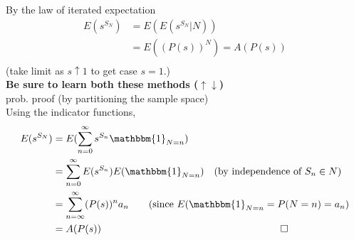\documentclass[12pt]{article}
\theoremstyle{definition}
\theoremstyle{plain}
\begin{document}
By the law of iterated expectation 
\begin{displaymath}
\begin{aligned}
E(s^{S_N}) &= E(E(s^{S_N}|N)) \\
		&=E((P(s))^N) = A(P(s)) \\
\end{aligned}
\end{displaymath}
(take limit as $s\uparrow 1$ to get case $s=1$.) \\
\textbf{Be sure to learn both these methods ($\uparrow \downarrow$)} \\
prob. proof (by partitioning the sample space)\\
Using the indicator functions,
\begin{displaymath}
\begin{aligned}
E(s^{S_N}) & = E(\sum_{n=0}^\infty s^{S_n} \mathbbm{1}_{N=n}) \\
		&= \sum_{n=0}^\infty E(s^{S_n})E(\mathbbm{1}_{N=n}) \quad \mbox{(by independence of $S_n \in N$)}\\
		&= \sum_{n=\infty}^\infty (P(s))^n a_n \qquad \mbox{(since $E(\mathbbm{1}_{N=n} = P(N=n) = a_n$)} \\
		&= A(P(s))  \qquad \qquad \qquad\qquad\qquad\qquad\qquad \qquad \qquad \square
\end{aligned}
\end{displaymath}
\end{document}
